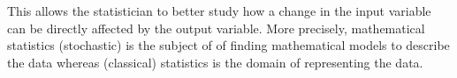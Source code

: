 This allows the statistician to better study how a change in the input variable can be 
directly affected by the output variable.\cite{gontcharov2019}
More precisely, mathematical statistics (stochastic)\cite{haertler2014statistisch} is the subject of of 
finding mathematical models to describe the data 
whereas (classical) statistics is the domain of representing the data. 

